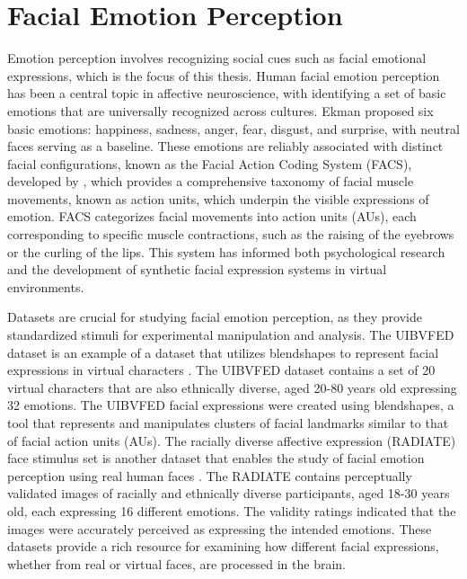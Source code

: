 \section{Facial Emotion Perception}
Emotion perception involves recognizing social cues such as facial emotional expressions, which is the focus of this thesis.
Human facial emotion perception has been a central topic in affective neuroscience, with \cite{ekman1971constants} identifying a set of basic emotions that are universally recognized across cultures. 
Ekman proposed six basic emotions: happiness, sadness, anger, fear, disgust, and surprise, with neutral faces serving as a baseline. 
These emotions are reliably associated with distinct facial configurations, known as the Facial Action Coding System (FACS), developed by \cite{ekman1978facial}, which provides a comprehensive taxonomy of facial muscle movements, known as action units, which underpin the visible expressions of emotion. 
FACS categorizes facial movements into action units (AUs), each corresponding to specific muscle contractions, such as the raising of the eyebrows or the curling of the lips.
This system has informed both psychological research and the development of synthetic facial expression systems in virtual environments. 

Datasets are crucial for studying facial emotion perception, as they provide standardized stimuli for experimental manipulation and analysis.
The UIBVFED dataset is an example of a dataset that utilizes blendshapes to represent facial expressions in virtual characters \citep{oliver_uibvfed_2020}. 
The UIBVFED dataset contains a set of 20 virtual characters that are also ethnically diverse, aged 20-80 years old expressing 32 emotions. 
The UIBVFED facial expressions were created using blendshapes, a tool that represents and manipulates clusters of facial landmarks similar to that of facial action units (AUs).
The racially diverse affective expression (RADIATE) face stimulus set is another dataset that enables the study of facial emotion perception using real human faces \citep{conley_racially_2018}.
The RADIATE contains perceptually validated images of racially and ethnically diverse participants, aged 18-30 years old, each expressing 16 different emotions. 
The validity ratings indicated that the images were accurately perceived as expressing the intended emotions. 
These datasets provide a rich resource for examining how different facial expressions, whether from real or virtual faces, are processed in the brain.

